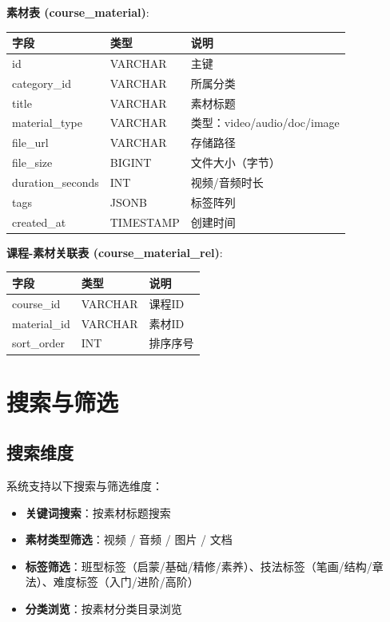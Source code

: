 \documentclass[11pt,a4paper]{article}
\begin{document}
\vspace{0.5em}
\textbf{素材表 (course\_material)}:

\begin{tabular}{lll}
\toprule
字段 & 类型 & 说明 \\
\midrule
id & VARCHAR & 主键 \\
category\_id & VARCHAR & 所属分类 \\
title & VARCHAR & 素材标题 \\
material\_type & VARCHAR & 类型：video/audio/doc/image \\
file\_url & VARCHAR & 存储路径 \\
file\_size & BIGINT & 文件大小（字节） \\
duration\_seconds & INT & 视频/音频时长 \\
tags & JSONB & 标签阵列 \\
created\_at & TIMESTAMP & 创建时间 \\
\bottomrule
\end{tabular}

\vspace{0.5em}
\textbf{课程-素材关联表 (course\_material\_rel)}:

\begin{tabular}{lll}
\toprule
字段 & 类型 & 说明 \\
\midrule
course\_id & VARCHAR & 课程ID \\
material\_id & VARCHAR & 素材ID \\
sort\_order & INT & 排序序号 \\
\bottomrule
\end{tabular}

\section{搜索与筛选}

\subsection{搜索维度}

系统支持以下搜索与筛选维度：

\begin{itemize}
  \item \textbf{关键词搜索}：按素材标题搜索
  \item \textbf{素材类型筛选}：视频 / 音频 / 图片 / 文档
  \item \textbf{标签筛选}：班型标签（启蒙/基础/精修/素养）、技法标签（笔画/结构/章法）、难度标签（入门/进阶/高阶）
  \item \textbf{分类浏览}：按素材分类目录浏览
\end{itemize}
\end{document}
